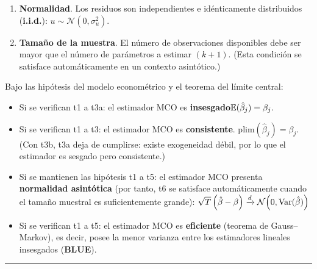 \begin{f}
\begin{enumerate}[leftmargin=*, label=t\arabic{*}.]
 		\item \textbf{Normalidad}. Los residuos son independientes e idénticamente distribuidos (\textbf{i.i.d.}): \(u\sim\mathcal N(0,\sigma_u^2).\)
 		\item \textbf{Tamaño de la muestra}. El número de observaciones disponibles debe ser mayor que el número de parámetros a estimar \((k+1)\). (Esta condición se satisface automáticamente en un contexto asintótico.)
 		
 	\end{enumerate}
 	
 \end{f}
 
\begin{f}
	
	Bajo las hipótesis del modelo econométrico y el teorema del límite central:
	
	\begin{itemize}[leftmargin=*]
		
		\item Si se verifican t1 a t3a: el estimador MCO es \textbf{insesgado}\(\mathbb{E}(\hat{\beta}_{j})=\beta_{j}.\)
		\item Si se verifican t1 a t3: el estimador MCO es \textbf{consistente}. \(\mathrm{plim}(\hat{\beta}_{j})=\beta_{j}.\) (Con t3b, t3a deja de cumplirse: existe exogeneidad débil, por lo que el estimador es sesgado pero consistente.) 
		\item Si se mantienen las hipótesis t1 a t5: el estimador MCO presenta \textbf{normalidad asintótica} (por tanto, t6 se satisface automáticamente cuando el tamaño muestral es suficientemente grande):
		\( \sqrt{T}\left(\hat{\beta}-\beta\right) \xrightarrow{d} \mathcal N\!\left(0,\mathrm{Var}(\hat{\beta})\right)\)
		\item Si se verifican t1 a t5: el estimador MCO es \textbf{eficiente} (teorema de Gauss--Markov), es decir, posee la menor varianza entre los estimadores lineales insesgados (\textbf{BLUE}).
	\end{itemize}
	
\end{f}  \hrule

